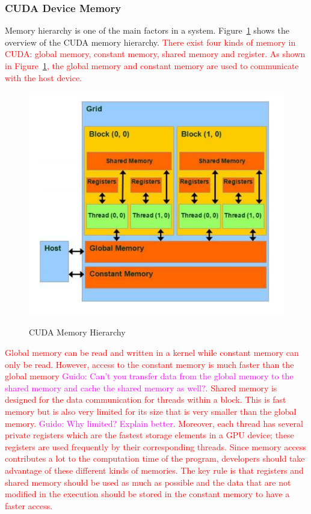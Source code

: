 \documentclass[Ingles]{ic-tese-v1}
\newcommand{\guido}[1]{\noindent\textcolor{magenta}{Guido: {#1}}}
\newcommand{\ed}[1]{\noindent\textcolor{red}{ {#1}}}
\newcommand{\guido}[1]{}
\newcommand{\ed}[1]{}
\newcommand{\rfig}[1]{Figure~\ref{fig:#1}}
\begin{document}
\newpage
\subsubsection{CUDA Device Memory}
\label{CUDA Device Memory}
Memory hierarchy is one of the main factors in a system. \rfig{cudamemory} shows the overview of the CUDA memory hierarchy. \ed{There exist 
four kinds of memory in CUDA: global memory, constant memory, shared memory and register. As shown in \rfig{cudamemory}, the global memory and constant memory are used to communicate with the host device.}\\

\begin{figure}[t]
	\caption{CUDA Memory Hierarchy}
	\centering
	\includegraphics[scale=0.70]{images/cuda_memory.png}
	\label{fig:cudamemory}
\end{figure}

\ed{Global memory can be read and written in a kernel while constant memory can only be
read. However, access to the constant memory is much faster than the global memory \guido{Can't you transfer data from the  global memory to the shared memory and   cache the shared memory as well?}. Shared memory is designed for the data communication for 
threads within a block. This is fast memory but is also very limited for its size that is very smaller than the global memory. \guido{Why limited? Explain better}. Moreover, each thread has several private registers which are the fastest storage elements in a GPU device; these registers are used   frequently by their corresponding threads. Since memory access contributes a lot to the computation time of the program, developers should take advantage of these different kinds of memories. The key rule is that registers and shared memory should be used as much as possible and the data that are not modified in the execution should be stored in the constant memory to have a faster access.}
\end{document}
